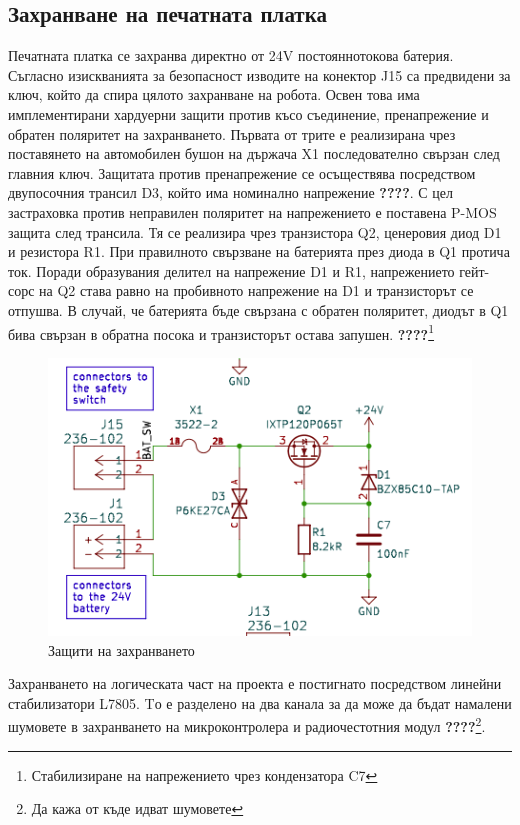 \subsection{Захранване на печатната платка}

Печатната платка се захранва директно от 24V постояннотокова батерия. Съгласно изискванията за безопасност изводите на конектор J15 са предвидени за ключ, който да спира цялото захранване на робота. Освен това има имплементирани хардуерни защити против късо съединение, пренапрежение и обратен поляритет на захранването. Първата от трите е реализирана чрез поставянето на автомобилен бушон на държача X1 последователно свързан след главния ключ. Защитата против пренапрежение се осъществява посредством двупосочния трансил D3, който има номинално напрежение \textbf{????}. С цел застраховка против неправилен поляритет на напрежението е поставена P-MOS защита след трансила. Тя се реализира чрез транзистора Q2, ценеровия диод D1 и резистора R1. При правилното свързване на батерията през диода в Q1 протича ток. Поради образувания делител на напрежение D1 и R1, напрежението гейт-сорс на Q2 става равно на пробивното напрежение на D1 и транзисторът се отпушва. В случай, че батерията бъде свързана с обратен поляритет, диодът в Q1 бива свързан в обратна посока и транзисторът остава запушен. 
\textbf{????}\footnote{Стабилизиране на напрежението чрез кондензатора C7}

\begin{figure}[H]
    \centering
    \includegraphics[width=0.6\linewidth]{images/power-protection.png}
    
    \caption{Защити на захранването}
    \label{fig:power-protection} 
\end{figure}

Захранването на логическата част на проекта е постигнато посредством линейни стабилизатори L7805. Tо е разделено на два канала за да може да бъдат намалени шумовете в захранването на микроконтролера и радиочестотния модул \textbf{????}\footnote{Да кажа от къде идват шумовете}. 

